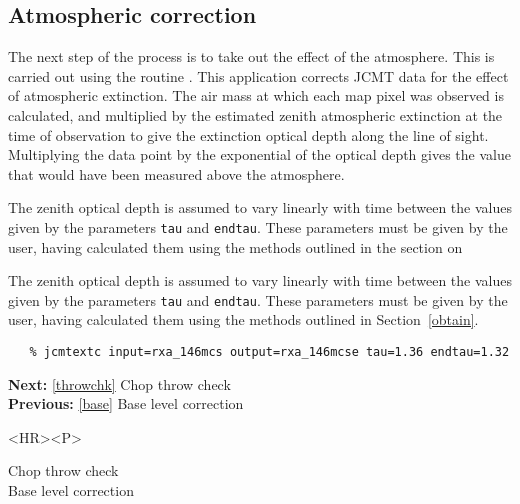 \subsection{\label{extinct}Atmospheric correction}

   The next step of the process is to take out the effect of the
   atmosphere. This is carried out using the routine
{\tt {}}.
   This application corrects JCMT data for the effect of atmospheric
   extinction. The air mass at which each map pixel was observed is
   calculated, and multiplied by the estimated zenith atmospheric
   extinction at the time of observation to give the extinction optical
   depth along the line of sight. Multiplying the data point by the
   exponential of the optical depth gives the value that would have been
   measured above the atmosphere.

\begin{htmlonly}
   The zenith optical depth is assumed to
   vary linearly with time between the values given by the parameters
   {\tt tau} and {\tt endtau}. These parameters must be
   given by the user, having calculated them using the methods outlined
   in the section on
\end{htmlonly}
\begin{latexonly}
   The zenith optical depth is assumed to
   vary linearly with time between the values given by the parameters
   {\tt tau} and {\tt endtau}. These parameters must be
   given by the user, having calculated them using the methods outlined
   in
Section~\ref{obtain}.
\end{latexonly}

\begin{verbatim}
   % jcmtextc input=rxa_146mcs output=rxa_146mcse tau=1.36 endtau=1.32
\end{verbatim}

\begin{latexonly}
{\bf Next:} \ref{throwchk} Chop throw check\\
{\bf Previous:} \ref{base} Base level correction\\
\end{latexonly}

\begin{htmlonly}
\begin{rawhtml} <HR><P> \end{rawhtml}
{\bf {}} Chop throw check\\
{\bf {}} Base level correction\\
{\bf {}}\\
{\bf {}}\\
\end{htmlonly}


